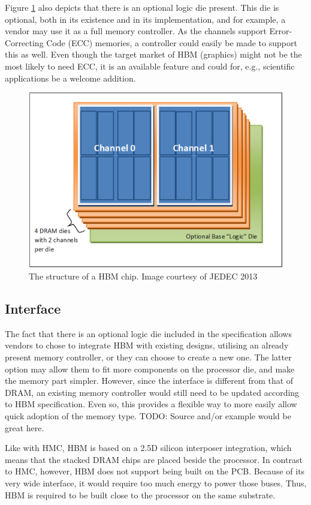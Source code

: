Figure \ref{HBM-structure} also depicts that there is an optional logic die present. This die is optional, both in its existence and in its implementation, and for example, a vendor may use it as a full memory controller. As the channels support Error-Correcting Code (ECC) memories, a controller could easily be made to support this as well. Even though the target market of HBM (graphics) might not be the most likely to need ECC, it is an available feature and could for, e.g., scientific applications be a welcome addition. 

\begin{figure}[!h]
\centering
\includegraphics[width=0.75\linewidth]{figure/HBM_structure.PNG}
\caption{The structure of a HBM chip. Image courtesy of JEDEC 2013 }
\label{HBM-structure}
\end{figure}

\subsection{Interface}
The fact that there is an optional logic die included in the specification allows vendors to chose to integrate HBM with existing designs, utilising an already present memory controller, or they can choose to create a new one. The latter option may allow them to fit more components on the processor die, and make the memory part simpler. However, since the interface is different from that of DRAM, an existing memory controller would still need to be updated according to HBM specification. Even so, this provides a flexible way to more easily allow quick adoption of the memory type. TODO: Source and/or example would be great here.
\bigskip

Like with HMC, HBM is based on a 2.5D silicon interposer integration, which means that the stacked DRAM chips are placed beside the processor. In contrast to HMC, however, HBM does not support being built on the PCB. Because of its very wide interface, it would require too much energy to power those buses. Thus, HBM is required to be built close to the processor on the same substrate.

